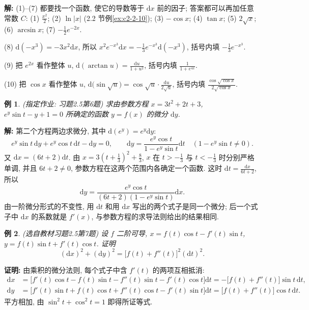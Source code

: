 \documentclass[UTF8,openany]{ctexbook}
\theoremstyle{chinesetextbook}
\newtheorem{example}{例}[section]
\newenvironment{cnproof}{\par\indent\textbf{证明:} \ignorespaces}{\par}
\newenvironment{cnsolution}{\par\indent\textbf{解:} \ignorespaces}{\par}
\newcommand{\dd}{\mathrm d}
\begin{document}
\begin{cnsolution}
(1)–(7) 都要找一个函数, 使它的导数等于 $\dd x$ 前的因子; 答案都可以再加任意常数 $C$: (1) $\displaystyle\frac{x^2}2$; (2) $\ln|x|$ (2.2 节例\ref{ex:c2-2-10}); (3) $-\cos x$; (4) $\tan x$; (5) $2\sqrt x$; (6) $\arcsin x$; (7) $\displaystyle-\frac12e^{-2x}$.

(8) $\dd(-x^3)=-3x^2\dd x$, 所以 $\displaystyle x^2e^{-x^3}\dd x=-\frac13e^{-x^3}\dd(-x^3)$, 括号内填 $\displaystyle-\frac13e^{-x^3}$.

(9) 把 $e^{2x}$ 看作整体 $u$, $\displaystyle\dd(\arctan u)=\frac{\dd u}{1+u^2}$, 括号内填 $\displaystyle\frac1{1+e^{4x}}$.

(10) 把 $\cos x$ 看作整体 $u$, $\displaystyle\dd\bigl(\sin\sqrt u\bigr)=\cos\sqrt u\cdot\frac{\dd u}{2\sqrt u}$, 括号内填 $\displaystyle\frac{\cos\sqrt{\cos x}}{2\sqrt{\cos x}}$.
\end{cnsolution}
\begin{example}\label{ex:c2-h5-6}
\textnormal{(指定作业: 习题2.5第6题)} 求由参数方程 $x=3t^2+2t+3$, $e^y\sin t-y+1=0$ 所确定的函数 $y=f(x)$ 的微分 $\dd y$.
\end{example}
\begin{cnsolution}
第二个方程两边求微分, 其中 $\dd(e^y)=e^y\dd y$:
\[
e^y\sin t\,\dd y+e^y\cos t\,\dd t-\dd y=0,\qquad\dd y=\frac{e^y\cos t}{1-e^y\sin t}\dd t\quad(1-e^y\sin t\ne0).
\]
又 $\dd x=(6t+2)\dd t$. 由 $\displaystyle x=3\left(t+\frac13\right)^2+\frac83$, $x$ 在 $\displaystyle t>-\frac13$ 与 $\displaystyle t<-\frac13$ 时分别严格单调, 并且 $6t+2\ne0$, 参数方程在这两个范围内各确定一个函数. 这时 $\displaystyle\dd t=\frac{\dd x}{6t+2}$, 所以
\[
\dd y=\frac{e^y\cos t}{(6t+2)(1-e^y\sin t)}\dd x.
\]
由一阶微分形式的不变性, 用 $\dd t$ 和用 $\dd x$ 写出的两个式子是同一个微分; 后一个式子中 $\dd x$ 的系数就是 $f'(x)$, 与参数方程的求导法则给出的结果相同.
\end{cnsolution}
\begin{example}\label{ex:c2-h5-7}
\textnormal{(选自教材习题2.5第7题)} 设 $f$ 二阶可导, $x=f(t)\cos t-f'(t)\sin t$, $y=f(t)\sin t+f'(t)\cos t$. 证明
\[
(\dd x)^2+(\dd y)^2=\bigl[f(t)+f''(t)\bigr]^2(\dd t)^2.
\]
\end{example}
\begin{cnproof}
由乘积的微分法则, 每个式子中含 $f'(t)$ 的两项互相抵消:
\[
\begin{aligned}
\dd x&=\bigl[f'(t)\cos t-f(t)\sin t-f''(t)\sin t-f'(t)\cos t\bigr]\dd t=-\bigl[f(t)+f''(t)\bigr]\sin t\,\dd t,\\
\dd y&=\bigl[f'(t)\sin t+f(t)\cos t+f''(t)\cos t-f'(t)\sin t\bigr]\dd t=\bigl[f(t)+f''(t)\bigr]\cos t\,\dd t.
\end{aligned}
\]
平方相加, 由 $\sin^2t+\cos^2t=1$ 即得所证等式.
\end{cnproof}
\end{document}
